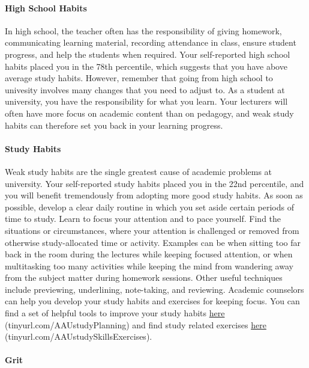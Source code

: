 \documentclass[]{article}
\let\oldparagraph\paragraph
\renewcommand{\paragraph}[1]{\oldparagraph{#1}\mbox{}}
\begin{document}
\paragraph{High School Habits}\label{high-school-habits}

In high school, the teacher often has the responsibility of giving
homework, communicating learning material, recording attendance in
class, ensure student progress, and help the students when required.
Your self-reported high school habits placed you in the 78th percentile,
which suggests that you have above average study habits. However,
remember that going from high school to univesity involves many changes
that you need to adjust to. As a student at university, you have the
responsibility for what you learn. Your lecturers will often have more
focus on academic content than on pedagogy, and weak study habits can
therefore set you back in your learning progress.

\paragraph{Study Habits}\label{study-habits}

Weak study habits are the single greatest cause of academic problems at
university. Your self-reported study habits placed you in the 22nd
percentile, and you will benefit tremendously from adopting more good
study habits. As soon as possible, develop a clear daily routine in
which you set aside certain periods of time to study. Learn to focus
your attention and to pace yourself. Find the situations or
circumstances, where your attention is challenged or removed from
otherwise study-allocated time or activity. Examples can be when sitting
too far back in the room during the lectures while keeping focused
attention, or when multitasking too many activities while keeping the
mind from wandering away from the subject matter during homework
sessions. Other useful techniques include previewing, underlining,
note-taking, and reviewing. Academic counselors can help you develop
your study habits and exercises for keeping focus. You can find a set of
helpful tools to improve your study habits
\href{tinyurl.com/AAUstudyPlanning}{here} (tinyurl.com/AAUstudyPlanning)
and find study related exercises
\href{tinyurl.com/AAUstudySkillsExercises}{here}
(tinyurl.com/AAUstudySkillsExercises).

\paragraph{Grit}\label{grit}
\end{document}

